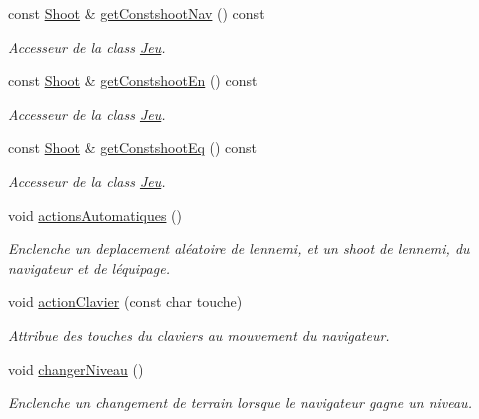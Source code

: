 \begin{DoxyCompactItemize}
const \hyperlink{class_shoot}{Shoot} \& \hyperlink{class_jeu_af71805735942a00e774ab906a3019ddf}{get\+Constshoot\+Nav} () const
\begin{DoxyCompactList}\small\item\em Accesseur de la class \hyperlink{class_jeu}{Jeu}. \end{DoxyCompactList}\item 
const \hyperlink{class_shoot}{Shoot} \& \hyperlink{class_jeu_ae864beb5c3c85c1d152dedf39c838254}{get\+Constshoot\+En} () const
\begin{DoxyCompactList}\small\item\em Accesseur de la class \hyperlink{class_jeu}{Jeu}. \end{DoxyCompactList}\item 
const \hyperlink{class_shoot}{Shoot} \& \hyperlink{class_jeu_ac305ed7d05845e93da364408ddf23f7a}{get\+Constshoot\+Eq} () const
\begin{DoxyCompactList}\small\item\em Accesseur de la class \hyperlink{class_jeu}{Jeu}. \end{DoxyCompactList}\item 
void \hyperlink{class_jeu_a849e140df1504ddfd1e1eccc4374718f}{actions\+Automatiques} ()
\begin{DoxyCompactList}\small\item\em Enclenche un deplacement aléatoire de l\textquotesingle{}ennemi, et un shoot de l\textquotesingle{}ennemi, du navigateur et de l\textquotesingle{}équipage. \end{DoxyCompactList}\item 
void \hyperlink{class_jeu_ab27fb1db9e2ae2a0c19a90ecc838319f}{action\+Clavier} (const char touche)
\begin{DoxyCompactList}\small\item\em Attribue des touches du claviers au mouvement du navigateur. \end{DoxyCompactList}\item 
void \hyperlink{class_jeu_aa00e3f0a90d6b38c83c16700cdd15190}{changer\+Niveau} ()
\begin{DoxyCompactList}\small\item\em Enclenche un changement de terrain lorsque le navigateur gagne un niveau. \end{DoxyCompactList}\end{DoxyCompactItemize}
